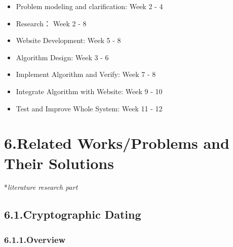 \documentclass{article}
\begin{document}
\begin{itemize}[noitemsep,topsep=\mdcompacttopsep]%

\item{}Problem modeling and clarification: Week 2 - 4%

\item{}Research： Week 2 - 8%

\item{}Website Development: Week 5 - 8%

\item{}Algorithm Design: Week 3 - 6%

\item{}Implement Algorithm and Verify: Week 7 - 8%

\item{}Integrate Algorithm with Website: Week 9 - 10%

\item{}Test and Improve Whole System: Week 11 - 12%
\end{itemize}%

\section{6.\hspace*{0.5em}Related Works/Problems and Their Solutions}\label{sec-related-worksproblems-and-their-solutions}%

\noindent{}*\emph{literature research part}%

\subsection{6.1.\hspace*{0.5em}Cryptographic Dating}\label{sec-cryptographic-dating}%

\subsubsection{6.1.1.\hspace*{0.5em}Overview}\label{sec-overview}%
\end{document}
